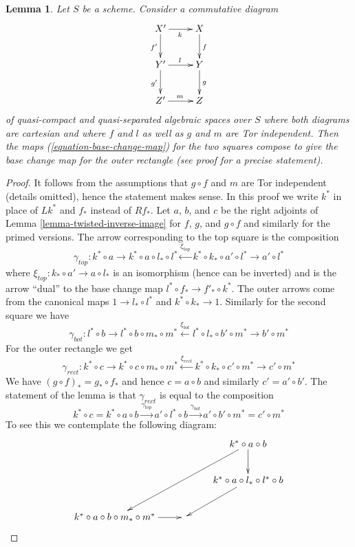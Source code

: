 \documentclass{stacks-project}
\theoremstyle{plain}
\newtheorem{lemma}[subsection]{Lemma}
\theoremstyle{definition}
\theoremstyle{remark}
\numberwithin{equation}{subsection}
\begin{document}
\begin{lemma}
\label{lemma-compose-base-change-maps}
Let $S$ be a scheme. Consider a commutative diagram
$$
\xymatrix{
X' \ar[r]_k \ar[d]_{f'} & X \ar[d]^f \\
Y' \ar[r]^l \ar[d]_{g'} & Y \ar[d]^g \\
Z' \ar[r]^m & Z
}
$$
of quasi-compact and quasi-separated algebraic spaces over $S$ where
both diagrams are cartesian and where $f$ and $l$
as well as $g$ and $m$ are Tor independent.
Then the maps (\ref{equation-base-change-map})
for the two squares compose to give the base
change map for the outer rectangle (see proof for a precise statement).
\end{lemma}

\begin{proof}
It follows from the assumptions that $g \circ f$ and $m$ are Tor
independent (details omitted), hence the statement makes sense.
In this proof we write $k^*$ in place of $Lk^*$ and $f_*$ instead
of $Rf_*$. Let $a$, $b$, and $c$ be the right adjoints of
Lemma \ref{lemma-twisted-inverse-image}
for $f$, $g$, and $g \circ f$ and similarly for the primed versions.
The arrow corresponding to the top square is the composition
$$
\gamma_{top} :
k^* \circ a \to k^* \circ a \circ l_* \circ l^*
\xleftarrow{\xi_{top}} k^* \circ k_* \circ a' \circ l^* \to a' \circ l^*
$$
where $\xi_{top} : k_* \circ a' \to a \circ l_*$
is an isomorphism (hence can be inverted)
and is the arrow ``dual'' to the base change map
$l^* \circ f_* \to f'_* \circ k^*$. The outer arrows come
from the canonical maps $1 \to l_* \circ l^*$ and $k^* \circ k_* \to 1$.
Similarly for the second square we have
$$
\gamma_{bot} :
l^* \circ b \to l^* \circ b \circ m_* \circ m^*
\xleftarrow{\xi_{bot}} l^* \circ l_* \circ b' \circ m^* \to b' \circ m^*
$$
For the outer rectangle we get
$$
\gamma_{rect} :
k^* \circ c \to k^* \circ c \circ m_* \circ m^*
\xleftarrow{\xi_{rect}} k^* \circ k_* \circ c' \circ m^* \to c' \circ m^*
$$
We have $(g \circ f)_* = g_* \circ f_*$ and hence
$c = a \circ b$ and similarly $c' = a' \circ b'$.
The statement of the lemma is that $\gamma_{rect}$
is equal to the composition
$$
k^* \circ c = k^* \circ a \circ b \xrightarrow{\gamma_{top}}
a' \circ l^* \circ b \xrightarrow{\gamma_{bot}}
a' \circ b' \circ m^* = c' \circ m^*
$$
To see this we contemplate the following diagram:
$$
\xymatrix{
& & k^* \circ a \circ b \ar[d] \ar[lldd] \\
& & k^* \circ a \circ l_* \circ l^* \circ b \ar[ld] \\
k^* \circ a \circ b \circ m_* \circ m^* \ar[r] &
}$$
\end{proof}
\end{document}

